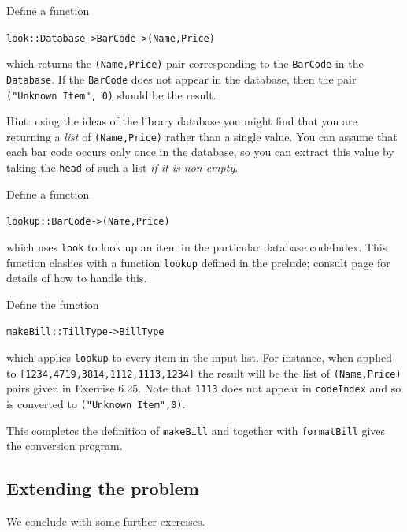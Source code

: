 \begin{exercises}

\item
Define a function
\begin{alltt}
look :: Database -> BarCode -> (Name,Price)
\end{alltt}
which returns the \texttt{(Name,Price)} pair corresponding to the \texttt{BarCode}
in the \texttt{Database}. If the \texttt{BarCode} does not appear in the database,
then the pair \texttt{("Unknown Item", 0)} should be the result.

Hint: using the ideas of the library database you might find that you
are returning a {\em list\/} of \texttt{(Name,Price)}
rather than a single value. You can assume
that each bar code occurs only once in the database, so you can extract
this value by taking the \texttt{head} of such a list {\em if it is non-empty}.

\item
Define a function
\begin{alltt}
lookup :: BarCode -> (Name,Price)
\end{alltt}
which uses \texttt{look} to look up an item in the particular database {\mi
codeIndex}. This function clashes with a function \texttt{lookup}
defined in the prelude; consult page \pageref{redefName} for details of how to
handle this.

\item
Define the function 
\begin{alltt}
makeBill   :: TillType -> BillType
\end{alltt}
which applies \texttt{lookup} to every item in the input list. For instance,
when applied to \texttt{[1234,4719,3814,1112,1113,1234]} the result will be
the list of \texttt{(Name,Price)} pairs given in Exercise 6.25.
Note that \texttt{1113} does not appear in \texttt{codeIndex} and so is converted
to \texttt{("Unknown Item",0)}.

This completes the definition of \texttt{makeBill} and together
with 
\texttt{formatBill} gives the conversion program. 
\end{exercises}

\subsection*{Extending the problem}

We conclude with some further
exercises.

